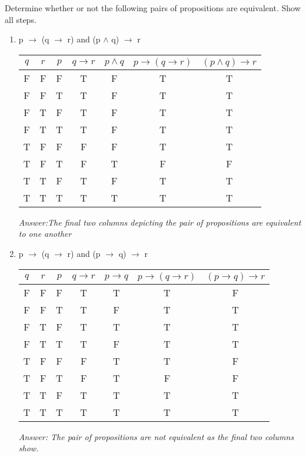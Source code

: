 \documentclass{article}
\begin{document}
Determine whether or not the following pairs of propositions are equivalent. Show all steps.\\
\begin{enumerate}
\item p $\to$ (q $\to$ r) and (p $\land$ q) $\to$ r

\begin{tabular}{|c|c|c|c|c|c|c|}
\hline
$q$ & $r$ & $p$ & $q \to r$ & $p \land q$ & $p \to (q \to r)$ & $(p \land q) \to r$ \\
\hline
F & F & F & T & F & T & T \\
F & F & T & T & F & T & T \\
F & T & F & T & F & T & T \\
F & T & T & T & F & T & T \\
T & F & F & F & F & T & T \\
T & F & T & F & T & F & F \\
T & T & F & T & F & T & T \\
T & T & T & T & T & T & T \\
\hline
\end{tabular}

\emph{Answer:The final two columns depicting the pair of propositions are equivalent to one another}

\item p $\to$ (q $\to$ r) and (p $\to$ q) $\to$ r \\
\begin{tabular}{|c|c|c|c|c|c|c|}
\hline
$q$ & $r$ & $p$ & $q \to r$ & $p \to q$ & $p \to (q \to r)$ & $(p \to q) \to r$ \\
\hline
F & F & F & T & T & T & F \\
F & F & T & T & F & T & T \\
F & T & F & T & T & T & T \\
F & T & T & T & F & T & T \\
T & F & F & F & T & T & F \\
T & F & T & F & T & F & F \\
T & T & F & T & T & T & T \\
T & T & T & T & T & T & T \\
\hline
\end{tabular}

\emph{Answer: The pair of propositions are not equivalent as the final two columns show.}
\end{enumerate}
\end{document}
